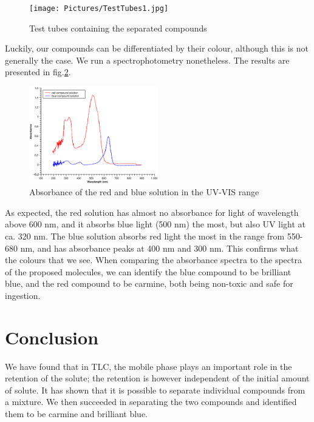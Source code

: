 \documentclass{article}
\begin{document}
\begin{figure}[!ht]
    \centering
    \texttt{[image: Pictures/TestTubes1.jpg]}
    \caption{Test tubes containing the separated compounds}
    \label{fig:testTubes}
\end{figure}

Luckily, our compounds can be differentiated by their colour, although this is not generally the case. We run a spectrophotometry nonetheless. The results are presented in fig.\ref{fig:absorbanceSpectrum}.

\begin{figure}[!ht]
    \centering
    \includegraphics[width=0.5\textwidth]{Absorbance.eps}
    \caption{Absorbance of the red and blue solution in the UV-VIS range}
    \label{fig:absorbanceSpectrum}
\end{figure}
\FloatBarrier

As expected, the red solution has almost no absorbance for light of wavelength above 600 nm, and it absorbs blue light (500 nm) the most, but also UV light at ca. 320 nm. The blue solution absorbs red light the most in the range from 550-680 nm, and has absorbance peaks at 400 nm and 300 nm. This confirms what the colours that we see.
When comparing the absorbance spectra to the spectra of the proposed molecules, we can identify the blue compound to be brilliant blue, and the red compound to be carmine, both being non-toxic and safe for ingestion.

\section{Conclusion}

We have found that in TLC, the mobile phase plays an important role in the retention of the solute; the retention is however independent of the initial amount of solute. It has shown that it is possible to separate individual compounds from a mixture. We then succeeded in separating the two compounds and identified them to be carmine and brilliant blue.
\end{document}
